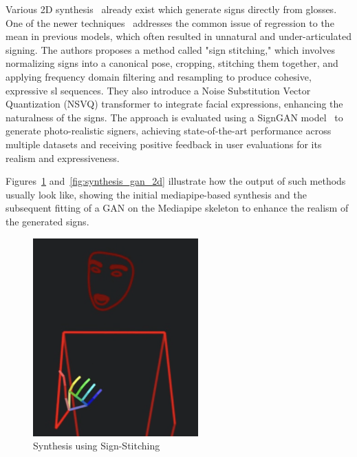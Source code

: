 \documentclass[../../main.tex]{subfiles}
\begin{document}
Various 2D synthesis~\cite{jiang2024signclipconnectingtextsign, moryossef2024signmtrealtimemultilingualsign} already exist which generate signs directly from \gls{glosses}. One of the newer techniques~\cite{walsh2024sign} addresses the common issue of regression to the mean in previous models, which often resulted in unnatural and under-articulated signing. The authors proposes a method called "sign stitching," which involves normalizing signs into a canonical pose, cropping, stitching them together, and applying frequency domain filtering and resampling to produce cohesive, expressive \gls{sl} sequences. They also introduce a Noise Substitution Vector Quantization (NSVQ) transformer to integrate facial expressions, enhancing the naturalness of the signs. The approach is evaluated using a SignGAN model~\cite{saunders2020everybodysignnowtranslating} to generate photo-realistic signers, achieving state-of-the-art performance across multiple datasets and receiving positive feedback in user evaluations for its realism and expressiveness.

Figures~\ref{fig:synthesis_mediaipe_2d} and~\ref{fig:synthesis_gan_2d} illustrate how the output of such methods usually look like, showing the initial mediapipe-based synthesis and the subsequent fitting of a GAN on the Mediapipe skeleton to enhance the realism of the generated signs.

\begin{figure}
  \centering \includegraphics[width = 2.5in]{chapters/background_work/images/sign_writing_synthesis.png} 
  \caption{Synthesis using Sign-Stitching} 
  \label{fig:synthesis_mediaipe_2d} 
\end{figure}
\end{document}
